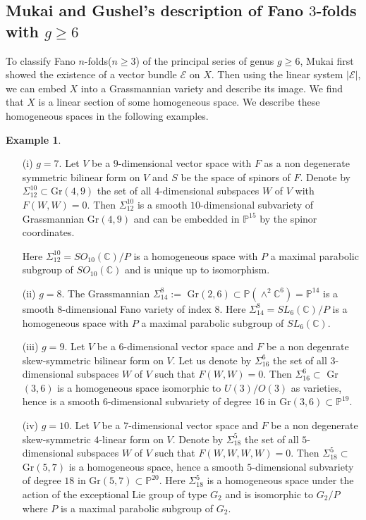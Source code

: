 \documentclass[11pt]{amsart}
\theoremstyle{plain}
\theoremstyle{definition}
\newtheorem{example}[theorem]{Example}
\theoremstyle{expl}
\begin{document}
\subsection{Mukai and Gushel's description of Fano $3$-folds with $g\geq 6$}
To classify Fano $n$-folds($n\geq 3$) of the principal series of genus $g \geq 6$, Mukai first showed the existence of a vector bundle $\mathcal{E}$ on $X$. Then using the linear system $|\mathcal{E}|$, we can embed $X$ into a Grassmannian variety and describe its image. We find that $X$ is a linear section of some homogeneous space. We describe these homogeneous spaces in the following examples.
\begin{example}\begin{enumerate}\item[(i)] $g=7$. Let $V$ be a $9$-dimensional vector space with $F$ as a non degenerate symmetric bilinear form on $V$ and $S$ be the space of spinors of $F$. Denote by $\Sigma_{12}^{10} \subset $Gr$(4,9)$ the set of all $4$-dimensional subspaces $W$ of $V$ with $F(W,W)=0$. Then $\Sigma_{12}^{10}$ is a smooth $10$-dimensional subvariety of Grassmannian Gr$(4,9)$ and can be embedded in $\mathbb{P}^{15}$ by the spinor coordinates. 

Here $\Sigma^{10}_{12} = SO_{10}(\mathbb{C})/P$ is a homogeneous space with $P$ a maximal parabolic subgroup of $SO_{10}(\mathbb{C})$ and is unique up to isomorphism.
\item[(ii)] $g=8$. The Grassmannian $\Sigma^8_{14}:=$ Gr$(2,6) \subset \mathbb{P}(\wedge^2 \mathbb{C}^6) = \mathbb{P}^{14}$ is a smooth $8$-dimensional Fano variety of index $8$.  Here $\Sigma^8_{14} = SL_6(\mathbb{C})/P$ is a homogeneous space with $P$ a maximal parabolic subgroup of $SL_6(\mathbb{C})$.
      \item[(iii)] $g=9$. Let $V$ be a $6$-dimensional vector space and $F$ be a non degenrate skew-symmetric bilinear form on $V$. Let us denote by $\Sigma_{16}^6$ the set of all $3$-dimensional subspaces $W$ of $V$ such that $F(W,W)=0$. Then $\Sigma_{16}^6 \subset $ Gr$(3,6)$ is a homogeneous space isomorphic to $U(3)/O(3)$ as varieties, hence is a smooth $6$-dimensional subvariety of degree $16$ in Gr$(3,6)\subset  \mathbb{P}^{19}$.
            \item[(iv)] $g=10$. Let $V$ be a $7$-dimensional vector space and $F$ be a non degenerate skew-symmetric $4$-linear form on $V$. Denote by $\Sigma_{18}^5$ the set of all $5$-dimensional subspaces $W$ of $V$ such that $F(W,W,W,W)=0$. Then $\Sigma_{18}^5 \subset $ Gr$(5,7)$ is a homogeneous space, hence a smooth $5$-dimensional subvariety of degree $18$ in Gr$(5,7) \subset \mathbb{P}^{20}$. Here $\Sigma^5_{18}$ is a homogeneous space under the action of the exceptional Lie group of type $G_2$ and is isomorphic to $G_2/P$ where $P$ is a maximal parabolic subgroup of $G_2$.
            

\end{enumerate}
\end{example}
\end{document}
